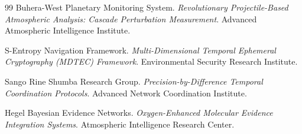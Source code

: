 \documentclass[12pt,a4paper]{article}
\begin{document}
\begin{thebibliography}{99}
Buhera-West Planetary Monitoring System. \textit{Revolutionary Projectile-Based Atmospheric Analysis: Cascade Perturbation Measurement}. Advanced Atmospheric Intelligence Institute.

S-Entropy Navigation Framework. \textit{Multi-Dimensional Temporal Ephemeral Cryptography (MDTEC) Framework}. Environmental Security Research Institute.

Sango Rine Shumba Research Group. \textit{Precision-by-Difference Temporal Coordination Protocols}. Advanced Network Coordination Institute.

Hegel Bayesian Evidence Networks. \textit{Oxygen-Enhanced Molecular Evidence Integration Systems}. Atmospheric Intelligence Research Center.

\end{thebibliography}
\end{document}
